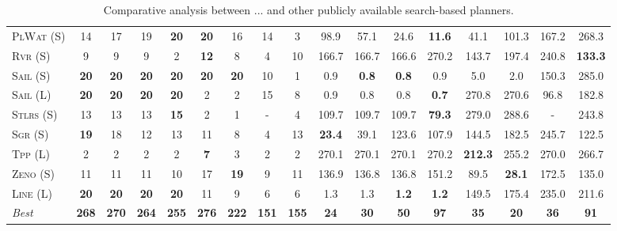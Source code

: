 \documentclass[11pt]{article}
\begin{document}
\begin{table}[tb]
{\begin{tabular}{|l||cccccccc||cccccccc||}
\textsc{PlWat} (S)&14&17&19&\textbf{20}&\textbf{20}&16&14&3&98.9&57.1&24.6&\textbf{11.6}&41.1&101.3&167.2&268.3\\
\textsc{Rvr} (S)&9&9&9&2&\textbf{12}&8&4&10&166.7&166.7&166.6&270.2&143.7&197.4&240.8&\textbf{133.3}\\
\textsc{Sail} (S)&\textbf{20}&\textbf{20}&\textbf{20}&\textbf{20}&\textbf{20}&\textbf{20}&10&1&0.9&\textbf{0.8}&\textbf{0.8}&0.9&5.0&2.0&150.3&285.0\\
\textsc{Sail} (L)&\textbf{20}&\textbf{20}&\textbf{20}&\textbf{20}&2&2&15&8&0.9&0.8&0.8&\textbf{0.7}&270.8&270.6&96.8&182.8\\
\textsc{Stlrs} (S)&13&13&13&\textbf{15}&2&1&-&4&109.7&109.7&109.7&\textbf{79.3}&279.0&288.6&-&243.8\\
\textsc{Sgr} (S)&\textbf{19}&18&12&13&11&8&4&13&\textbf{23.4}&39.1&123.6&107.9&144.5&182.5&245.7&122.5\\
\textsc{Tpp} (L)&2&2&2&2&\textbf{7}&3&2&2&270.1&270.1&270.1&270.2&\textbf{212.3}&255.2&270.0&266.7\\
\textsc{Zeno} (S)&11&11&11&10&17&\textbf{19}&9&11&136.9&136.8&136.8&151.2&89.5&\textbf{28.1}&172.5&135.0\\
\textsc{Line} (L)&\textbf{20}&\textbf{20}&\textbf{20}&\textbf{20}&11&9&6&6&1.3&1.3&\textbf{1.2}&\textbf{1.2}&149.5&175.4&235.0&211.6
\\\hline
\textit{Best}&\textbf{268}&\textbf{270}&\textbf{264}&\textbf{255}&\textbf{276}&\textbf{222}&\textbf{151}&\textbf{155}&\textbf{24}&\textbf{30}&\textbf{50}&\textbf{97}&\textbf{35}&\textbf{20}&\textbf{36}&\textbf{91}\\\hline

        \end{tabular}}
        \caption{Comparative analysis between ... and other publicly available search-based planners.}
        \label{tab:search}
        \end{table}
        
\end{document}
